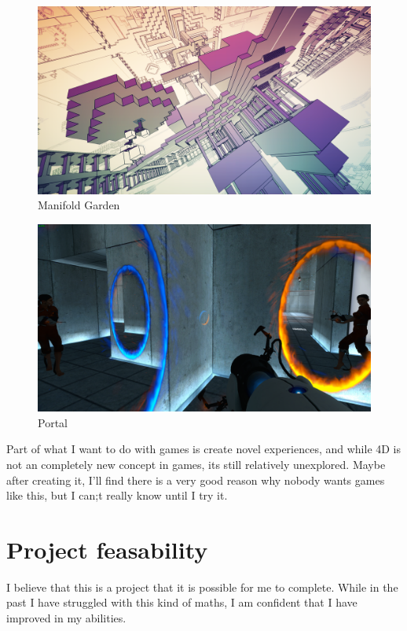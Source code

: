 \documentclass[12pt]{article}
\begin{document}
\begin{figure}
    \centering
    \includegraphics[width=\textwidth]{Media/ManifoldGarden.png}
    \caption{Manifold Garden}
\end{figure}
\begin{figure}
    \centering
    \includegraphics[width=\textwidth]{Media/Portal.png}
    \caption{Portal}
\end{figure}

Part of what I want to do with games is create novel experiences, and while 4D is not an completely new concept in games, its still relatively unexplored.
Maybe after creating it, I'll find there is a very good reason why nobody wants games like this, but I can;t really know until I try it.

\section{Project feasability}
I believe that this is a project that it is possible for me to complete. While in the past I have struggled with this kind of maths, I am confident that I have improved in my abilities.
\end{document}
